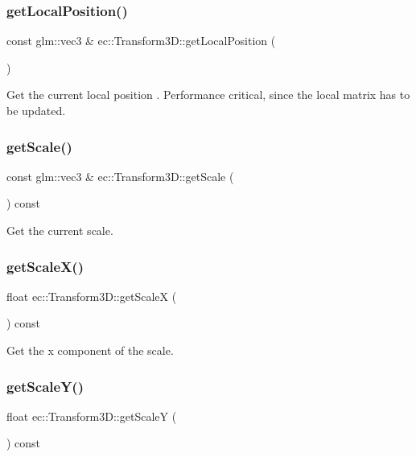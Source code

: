 \subsubsection{\texorpdfstring{get\+Local\+Position()}{getLocalPosition()}}
{\footnotesize\ttfamily const glm\+::vec3 \& ec\+::\+Transform3\+D\+::get\+Local\+Position (\begin{DoxyParamCaption}{ }\end{DoxyParamCaption})}

Get the current local position . Performance critical, since the local matrix has to be updated. \mbox{\label{classec_1_1_transform3_d_ab5f0e26d19bbb99a4624784d3024e654}} 
\subsubsection{\texorpdfstring{get\+Scale()}{getScale()}}
{\footnotesize\ttfamily const glm\+::vec3 \& ec\+::\+Transform3\+D\+::get\+Scale (\begin{DoxyParamCaption}{ }\end{DoxyParamCaption}) const}

Get the current scale. \mbox{\label{classec_1_1_transform3_d_a7ecc00577cd57f15ed63926a712cdcb1}} 
\subsubsection{\texorpdfstring{get\+Scale\+X()}{getScaleX()}}
{\footnotesize\ttfamily float ec\+::\+Transform3\+D\+::get\+ScaleX (\begin{DoxyParamCaption}{ }\end{DoxyParamCaption}) const}

Get the x component of the scale. \mbox{\label{classec_1_1_transform3_d_a99763688e60bc36134390327344f5df0}} 
\subsubsection{\texorpdfstring{get\+Scale\+Y()}{getScaleY()}}
{\footnotesize\ttfamily float ec\+::\+Transform3\+D\+::get\+ScaleY (\begin{DoxyParamCaption}{ }\end{DoxyParamCaption}) const}

